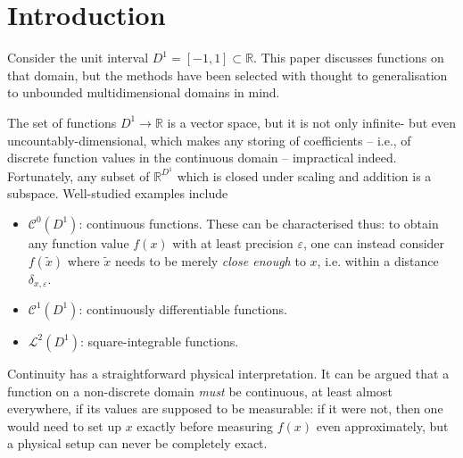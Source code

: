 \documentclass[sigplan,review,anonymous]{acmart}\settopmatter{printfolios=true,printccs=false,printacmref=false}
\begin{document}


\maketitle


\section{Introduction}

Consider the unit interval $D^1 = [-1,1] \subset \mathbb{R}$. This paper discusses functions on that domain, but the methods have been selected with thought to generalisation to unbounded multidimensional domains in mind.

The set of functions $D^1 \to \mathbb{R}$ is a vector space, but it is not only infinite- but even uncountably-dimensional, which makes any storing of coefficients -- i.e., of discrete function values in the continuous domain -- impractical indeed.
Fortunately, any subset of $\mathbb{R}^{D^1}$ which is closed under scaling and addition is a subspace. Well-studied examples include
\begin{itemize}
 \item $\mathcal{C}^0(D^1)$: continuous functions. These can be characterised thus: to obtain any function value $f(x)$ with at least precision $\varepsilon$, one can instead consider $f(\tilde{x})$ where $\tilde{x}$ needs to be merely \emph{close enough} to $x$, i.e. within a distance $\delta_{x,\varepsilon}$.
 \item $\mathcal{C}^1(D^1)$: continuously differentiable functions. %
 \item $\mathcal{L}^2(D^1)$: square-integrable functions. %
\end{itemize}
Continuity has a straightforward physical interpretation. It can be argued that a function on a non-discrete domain \emph{must} be continuous, at least almost everywhere,
if its values are supposed to be measurable: if it were not, then one would need to set up $x$ exactly before measuring $f(x)$ even approximately, but a physical setup can never be completely exact.
\end{document}
